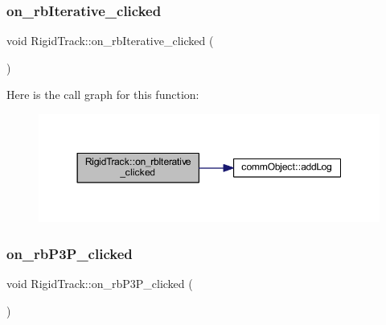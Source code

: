 \subsubsection{\texorpdfstring{on\+\_\+rb\+Iterative\+\_\+clicked}{on\_rbIterative\_clicked}}
{\footnotesize\ttfamily void Rigid\+Track\+::on\+\_\+rb\+Iterative\+\_\+clicked (\begin{DoxyParamCaption}{ }\end{DoxyParamCaption})\hspace{0.3cm}{\ttfamily [slot]}}

Here is the call graph for this function\+:
\nopagebreak
\begin{figure}[H]
\begin{center}
\leavevmode
\includegraphics[width=350pt]{class_rigid_track_ae5bcdd3fb7203b4a7d1fa97c1460af31_cgraph}
\end{center}
\end{figure}
\mbox{\label{class_rigid_track_ac1f10ea5ec3f718c152e245a04776454}} 
\subsubsection{\texorpdfstring{on\+\_\+rb\+P3\+P\+\_\+clicked}{on\_rbP3P\_clicked}}
{\footnotesize\ttfamily void Rigid\+Track\+::on\+\_\+rb\+P3\+P\+\_\+clicked (\begin{DoxyParamCaption}{ }\end{DoxyParamCaption})\hspace{0.3cm}{\ttfamily [slot]}}

